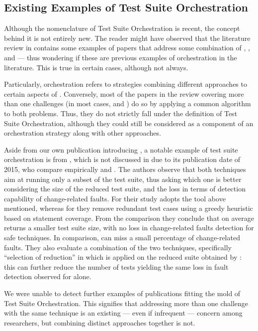 \subsection{Existing Examples of Test Suite Orchestration}

Although the nomenclature of Test Suite Orchestration is recent, the concept behind it is not entirely new.
The reader might have observed that the literature review in  contains some examples of papers that address some combination of \tcp, \tcs, and \tsr --- thus wondering if these are previous examples of orchestration in the literature.
This is true in certain cases, although not always.

Particularly, orchestration refers to strategies combining different approaches to certain aspects of \rt.
Conversely, most of the papers in the review covering more than one \rt challenges (in most cases, \tcp and \tcs) do so by applying a common algorithm to both problems.
Thus, they do not strictly fall under the definition of Test Suite Orchestration, although they could still be considered as a component of an orchestration strategy along with other approaches.

Aside from our own publication introducing \fz \cite{greca_comparing_2022}, a notable example of test suite orchestration is from \citet{shi2015comparing}, which is not discussed in  due to its publication date of 2015, who compare empirically \tsr and \tcs.
The authors observe that both techniques aim at running only a subset of the test suite, thus asking which one is better considering the size of the reduced test suite, and the loss in terms of detection capability of change-related faults.
For \tcs their study adopts the \ek tool above mentioned, whereas for \tsr they remove redundant test cases using a greedy heuristic based on statement coverage.
From the comparison they conclude that \tcs on average returns a smaller test suite size, with no loss in change-related faults detection for safe \tcs techniques.
In comparison, \tsr can miss a small percentage of change-related faults. They also evaluate a combination of the two techniques, specifically ``selection of reduction'' in which \tcs is applied on the reduced suite obtained by \tsr: this can further reduce the number of tests yielding the same loss in fault detection observed for \tsr alone.

We were unable to detect further examples of publications fitting the mold of Test Suite Orchestration.
This signifies that addressing more than one challenge with the same technique is an existing — even if infrequent — concern among researchers, but combining distinct approaches together is not.

